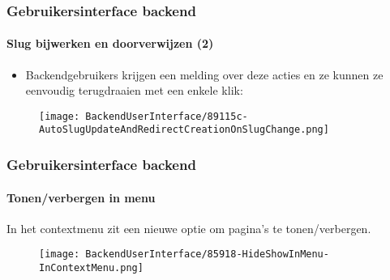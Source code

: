 
\begin{frame}[fragile]
	\frametitle{Gebruikersinterface backend}
	\framesubtitle{Slug bijwerken en doorverwijzen (2)}

	\begin{itemize}
		\item Backendgebruikers krijgen een melding over deze acties en ze kunnen
			ze eenvoudig terugdraaien met een enkele klik:

	\end{itemize}

	\begin{figure}
		\texttt{[image: BackendUserInterface/89115c-AutoSlugUpdateAndRedirectCreationOnSlugChange.png]}
	\end{figure}

\end{frame}


\begin{frame}[fragile]
	\frametitle{Gebruikersinterface backend}
	\framesubtitle{Tonen/verbergen in menu}

	In het contextmenu zit een nieuwe optie om pagina's te tonen/verbergen.

	\begin{figure}
		\texttt{[image: BackendUserInterface/85918-HideShowInMenu-InContextMenu.png]}
	\end{figure}

\end{frame}

